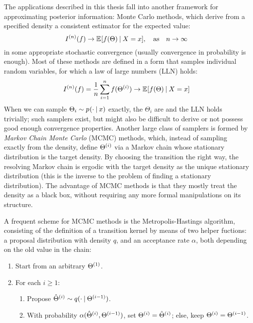 The applications described in this thesis fall into another framework for approximating posterior
information: Monte Carlo methods, which derive from a specified density a consistent estimator for
the expected value:
\begin{equation}
  \label{eq:mc-methods}
  \kth[n]{I}(f) \to \Exp{f(\Theta) \given X = x}, \quad \text{as} \quad n
  \to \infty
\end{equation}
in some appropriate stochastic convergence (usually convergence in probability is enough).  Most of
these methods are defined in a form that samples individual random variables, for which a law of
large numbers (LLN) holds:
\begin{equation}
  \label{eq:mc-lln}
  \kth[n]{I}(f) = \frac{1}{n} \sum_{i=1}^{n} f(\kth[i]{\Theta}) \to \Exp{f(\Theta) \given X = x}
\end{equation}
When we can sample \(\Theta_{i} \sim \prob{\cdot \given x}\) exactly, the \(\Theta_{i}\) are \iid{}
and the LLN holds trivially; such samplers exist, but might also be difficult to derive or not
possess good enough convergence properties.  Another large class of samplers is formed by
\emph{Markov Chain Monte Carlo} (MCMC) methods, which, instead of sampling exactly from the density,
define \(\kth[i]{\Theta}\) via a Markov chain whose stationary distribution is the target density.
By choosing the transition the right way, the resolving Markov chain is ergodic with the target
density as the unique stationary distribution (this is the inverse to the problem of finding a
stationary distribution).  The advantage of MCMC methods is that they mostly treat the density as a
black box, without requiring any more formal manipulations on its structure.

A frequent scheme for MCMC methods is the Metropolis-Hastings algorithm, consisting of the
definition of a transition kernel by means of two helper fuctions: a proposal distribution with
density \(q\), and an acceptance rate \(\alpha\), both depending on the old value in the
chain:
\begin{enumerate}
\item Start from an arbitrary \(\kth[1]{\Theta}\).
\item For each \(i \ge 1\):
  \begin{enumerate}
  \item Propose \(\kth[i]{\hat{\Theta}} \sim q(\cdot \given \kth[i-1]{\Theta})\).
  \item With probability \(\alpha(\kth[i]{\hat{\Theta}}, \kth[i-1]{\Theta})\), set
    \(\kth[i]{\Theta} = \kth[i]{\hat{\Theta}}\); else, keep \(\kth[i]{\Theta} = \kth[i-1]{\Theta}\).
  \end{enumerate}
\end{enumerate}

